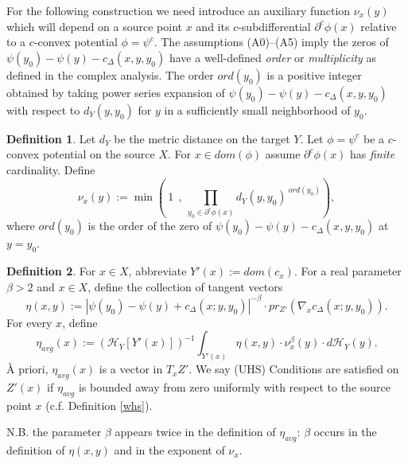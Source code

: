 \documentclass[12pt]{amsart}
\theoremstyle{definition}
\newtheorem{dfn}{Definition}
\theoremstyle{remark}
\newcommand{\bR}{\mathbb{R}}
\newcommand{\del}{\partial}
\newcommand{\cd}{c_\Delta}
\begin{document}
For the following construction we need introduce an auxiliary function $\nu_x(y)$ which will depend on a source point $x$ and its $c$-subdifferential $\del^c \phi(x)$ relative to a $c$-convex potential $\phi=\psi^c$. The assumptions (A0)--(A5) imply the zeros of $\psi(y_0)-\psi(y) -\cd(x,y,y_0)$ have a well-defined \emph{order} or \emph{multiplicity} as defined in the complex analysis. The order $ord(y_0)$ is a positive integer obtained by taking power series expansion of $\psi(y_0)-\psi(y) -\cd(x,y,y_0)$ with respect to $d_Y(y,y_0)$ for $y$ in a sufficiently small neighborhood of $y_0$. 


\begin{dfn}\label{order}
Let $d_Y$ be the metric distance on the target $Y$. Let $\phi=\psi^c$ be a $c$-convex potential on the source $X$. For $x\in dom(\phi)$ assume $\del^c \phi(x)$ has \emph{finite} cardinality. Define \begin{equation}\label{nuorder}
\nu_x(y):=\min(~1~~,~\prod_{y_0 \in \del^c \phi(x)} d_Y(y,y_0)^{~ord(y_0)}),\end{equation} where $ord(y_0)$ is the order of the zero of $\psi(y_0)-\psi(y) -\cd(x,y,y_0)$ at $y=y_0$. 
\end{dfn}




















\begin{dfn}
For $x\in X$, abbreviate $Y'(x):=dom(c_x)$. For a real parameter $\beta>2$ and $x\in X$, define the collection of tangent vectors $$ \eta(x, y):=|\psi(y_0)-\psi(y)+\cd(x; y, y_0)|^{-\beta} \cdot pr_{Z'}( \nabla_x \cd(x; y, y_0)). $$ For every $x$, define 
\begin{equation}
\eta_{avg}(x):=(\mathscr{H}_Y[Y'(x)])^{-1} \int_{Y'(x)} \eta(x,y) \cdot \nu^\beta_x (y) \cdot d\mathscr{H}_Y(y). 
\label{avg2}\end{equation} \`A priori, $\eta_{avg}(x)$ is a vector in $T_x Z'$. We say (UHS) Conditions are satisfied on $Z'(x)$ if $\eta_{avg}$ is bounded away from zero uniformly with respect to the source point $x$ (c.f. Definition \ref{whs}).
\end{dfn}
N.B. the parameter $\beta$ appears twice in the definition of $\eta_{avg}$: $\beta$ occurs in the definition of $\eta(x,y)$ and in the exponent of $\nu_x$. 
\end{document}
